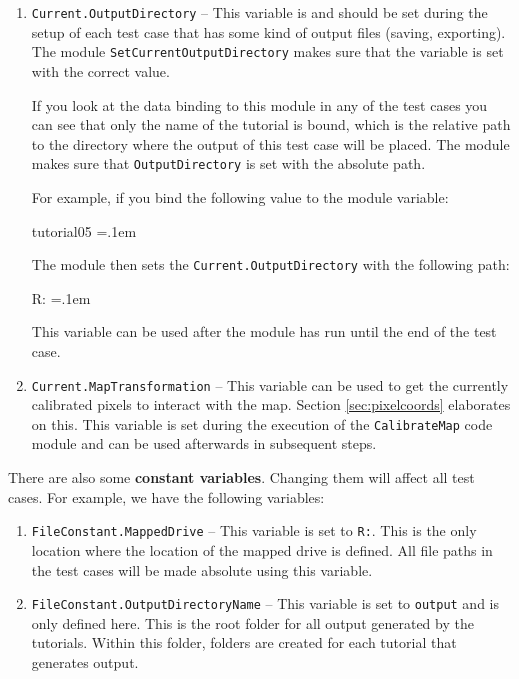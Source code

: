 \documentclass{article}
\newenvironment{lcverbatim}
 {\SaveVerbatim{cverb}}
 {\endSaveVerbatim
  \flushleft\fboxrule=0pt\fboxsep=.1em
  \colorbox{cverbbg}{%
    \makebox[\dimexpr\linewidth-2\fboxsep][l]{\BUseVerbatim{cverb}}%
  }
  \endflushleft
}
\newcommand{\inlverb}[1]{\colorbox{cverbbg}{\texttt{#1}}}
\begin{document}
\begin{enumerate}
    \item \inlverb{Current.OutputDirectory} --
    This variable is and should be set during the setup of each test case that has some kind of output files (saving, exporting). The module \inlverb{SetCurrentOutputDirectory} makes sure that the variable is set with the correct value. 
    
    If you look at the data binding to this module in any of the test cases you can see that only the name of the tutorial is bound, which is the relative path to the directory where the output of this test case will be placed. The module makes sure that \inlverb{OutputDirectory} is set with the absolute path.
    
    For example, if you bind the following value to the module variable:
    
\begin{lcverbatim}
tutorial05
\end{lcverbatim}

The module then sets the \inlverb{Current.OutputDirectory} with the following path:

\begin{lcverbatim}
R:\output{}
\end{lcverbatim}

This variable can be used after the module has run until the end of the test case.

    \item \inlverb{Current.MapTransformation} -- 
 This variable can be used to get the currently calibrated pixels to interact with the map. Section \ref{sec:pixelcoords} elaborates on this. This variable is set during the execution of the \inlverb{CalibrateMap} code module and can be used afterwards in subsequent steps.
\end{enumerate}

There are also some \textbf{constant variables}. Changing them will affect all test cases. For example, we have the following variables:

\begin{enumerate}
    \item \inlverb{FileConstant.MappedDrive} -- This variable is set to \inlverb{R:}. This is the only location where the location of the mapped drive is defined. All file paths in the test cases will be made absolute using this variable.
    \item \inlverb{FileConstant.OutputDirectoryName} -- This variable is set to \inlverb{output} and is only defined here. This is the root folder for all output generated by the tutorials. Within this folder, folders are created for each tutorial that generates output. 
\end{enumerate}
\end{document}

